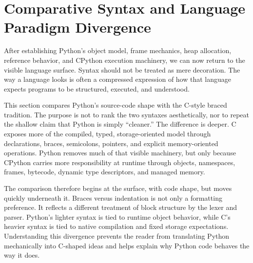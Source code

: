 \section{Comparative Syntax and Language Paradigm Divergence}

After establishing Python's object model, frame mechanics, heap allocation, reference behavior, and CPython execution machinery, we can now return to the visible language surface. Syntax should not be treated as mere decoration. The way a language looks is often a compressed expression of how that language expects programs to be structured, executed, and understood.

This section compares Python's source-code shape with the C-style braced tradition. The purpose is not to rank the two syntaxes aesthetically, nor to repeat the shallow claim that Python is simply ``cleaner.'' The difference is deeper. C exposes more of the compiled, typed, storage-oriented model through declarations, braces, semicolons, pointers, and explicit memory-oriented operations. Python removes much of that visible machinery, but only because CPython carries more responsibility at runtime through objects, namespaces, frames, bytecode, dynamic type descriptors, and managed memory.

The comparison therefore begins at the surface, with code shape, but moves quickly underneath it. Braces versus indentation is not only a formatting preference. It reflects a different treatment of block structure by the lexer and parser. Python's lighter syntax is tied to runtime object behavior, while C's heavier syntax is tied to native compilation and fixed storage expectations. Understanding this divergence prevents the reader from translating Python mechanically into C-shaped ideas and helps explain why Python code behaves the way it does.
